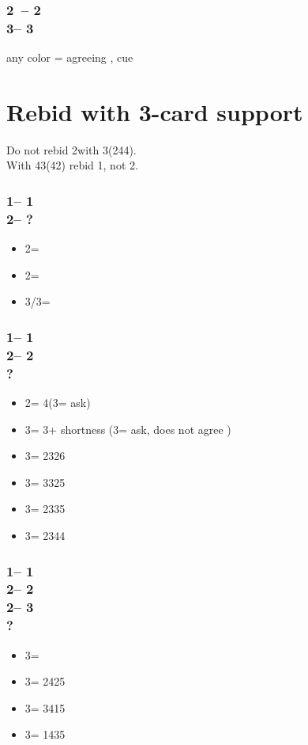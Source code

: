 \subsubsection*{2\clubs\ -- 2\\
                3\clubs -- 3\hearts}
any color = agreeing \hearts, cue

\section{\texorpdfstring{Rebid with 3-card support}{rebid3Card_KacperVersion}}\label{sec:rebid3Card_KacperVersion}

Do not rebid 2\spades with 3(244).\\
With 43(42) rebid 1\spades, not 2\hearts.

\subsubsection*{1\clubs -- 1\hearts\\
                2\hearts -- ?}
\begin{itemize}
    \item 2\spades = \gf
    \item 2\nt = \inv\ \spades
    \item 3\minor/3\hearts = \inv
\end{itemize}

\subsubsection*{1\clubs -- 1\hearts\\
                2\hearts -- 2\spades\\
                ?}
\begin{itemize}
    \item 2\nt = 4\hearts (3\clubs = ask)
    \item 3\clubs = 3\hearts + shortness (3\diams = ask, does not agree \hearts)
    \item 3\diams = 2326
    \item 3\hearts = 3325
    \item 3\spades = 2335
    \item 3\nt = 2344
\end{itemize}

\subsubsection*{1\clubs -- 1\hearts\\
                2\hearts -- 2\spades\\
                2\nt -- 3\clubs\\
                ?}
\begin{itemize}
    \item 3\diams = \bal
    \item 3\hearts = 2425
    \item 3\spades = 3415
    \item 3\nt = 1435
\end{itemize}

